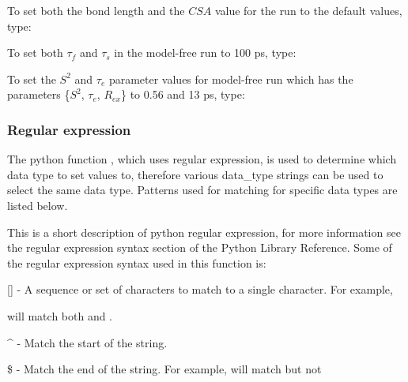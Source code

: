 To set both the bond length and the $CSA$ value for the run 
 to the default values, type:




To set both $\tau_f$ and $\tau_s$ in the model-free run 
 to 100 ps, type:





To set the $S^2$ and $\tau_e$ parameter values for model-free run 
 which has the parameters
\{$S^2$, $\tau_e$, $R_{ex}$\} to 0.56 and 13 ps, type:








\subsubsection{Regular expression}

The python function 
, which uses regular expression, is used to determine which data
type to set values to, therefore various data\_type strings can be used to select the same
data type.  Patterns used for matching for specific data types are listed below.

This is a short description of python regular expression, for more information see the
regular expression syntax section of the Python Library Reference.  Some of the regular
expression syntax used in this function is:

    [] - A sequence or set of characters to match to a single character.  For example,
    
 will match both 
 and 
.

    \^{} - Match the start of the string.

    \$ - Match the end of the string.  For example, 
 will match 
 but not 

